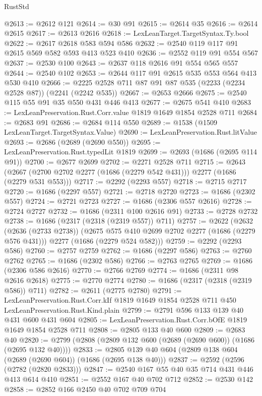 \begin{lexlean}{RustStd}
\begin{coremodule}
@2613 := @2612 @121
@2614 := @30 @91
@2615 := @2614 @35
@2616 := @2614 @2615
@2617 := @2613 @2616
@2618 := LexLeanTarget.TargetSyntax.Ty.bool
@2622 := @2617 @2618 @583 @594 @586
@2632 := @2540 @119 @117 @91 @2615 @569 @582 @593 @413 @523 @410
@2636 := @2552 @119 @91 @554 @567
@2637 := @2530 @100
@2643 := @2637 @118 @2616 @91 @554 @565 @557
@2644 := @2540 @102
@2653 := @2644 @117 @91 @2615 @535 @553 @564 @413 @530 @410
@2666 := @2225 @2528 @711 @87 @91 @87 @535 (@2233 (@2234 @2528 @87)) (@2241 (@2242 @535))
@2667 := @2653 @2666
@2675 := @2540 @115 @55 @91 @35 @550 @431 @446 @413
@2677 := @2675 @541 @410
@2683 := LexLeanPreservation.Rust.Corr.value @1819 @1649 @1854 @2528 @711
@2684 := @2683 @91
@2686 := @2684 @114 @550
@2689 := @1538 (@1509 LexLeanTarget.TargetSyntax.Value)
@2690 := LexLeanPreservation.Rust.litValue
@2693 := @2686 (@2689 (@2690 @550))
@2695 := LexLeanPreservation.Rust.typedLit @1819
@2699 := @2693 (@1686 (@2695 @114 @91))
@2700 := @2677 @2699
@2702 := @2271 @2528 @711
@2715 := @2643 (@2667 (@2700 @2702 @2277 (@1686 (@2279 @542 @431))) @2277 (@1686 (@2279 @531 @553)))
@2717 := @2292 (@2293 @557)
@2718 := @2715 @2717
@2720 := @1686 (@2297 @557)
@2721 := @2718 @2720
@2723 := @1686 (@2302 @557)
@2724 := @2721 @2723
@2727 := @1686 (@2306 @557 @2616)
@2728 := @2724 @2727
@2732 := @1686 (@2311 @100 @2616 @91)
@2733 := @2728 @2732
@2738 := @1686 (@2317 (@2318 (@2319 @557)) @711)
@2757 := @2622
    (@2632
      (@2636 (@2733 @2738))
      (@2675 @575 @410 @2699 @2702 @2277 (@1686 (@2279 @576 @431)))
      @2277
      (@1686 (@2279 @524 @582)))
@2759 := @2292 (@2293 @586)
@2760 := @2757 @2759
@2762 := @1686 (@2297 @586)
@2763 := @2760 @2762
@2765 := @1686 (@2302 @586)
@2766 := @2763 @2765
@2769 := @1686 (@2306 @586 @2616)
@2770 := @2766 @2769
@2774 := @1686 (@2311 @98 @2616 @2618)
@2775 := @2770 @2774
@2780 := @1686 (@2317 (@2318 (@2319 @586)) @711)
@2782 := @2611 (@2775 @2780)
@2791 := LexLeanPreservation.Rust.Corr.kIf
    @1819
    @1649
    @1854
    @2528
    @711
    @450
    LexLeanPreservation.Rust.Kind.plain
@2799 := @2791 @596 @133 @139 @40 @431 @600 @431 @604
@2805 := LexLeanPreservation.Rust.Corr.bOfE @1819 @1649 @1854 @2528 @711
@2808 := @2805 @133 @40 @600
@2809 := @2683 @40
@2820 := @2799 (@2808 (@2809 @132 @600 (@2689 (@2690 @600)) (@1686 (@2695 @132 @40))))
@2833 := @2805 @139 @40 @604 (@2809 @138 @604 (@2689 (@2690 @604)) (@1686 (@2695 @138 @40)))
@2837 := @2592 (@2596 (@2782 (@2820 @2833)))
@2847 := @2540 @167 @55 @40 @35 @714 @431 @446 @413 @614 @410
@2851 := @2552 @167 @40 @702 @712
@2852 := @2530 @142
@2858 := @2852 @166 @2450 @40 @702 @709 @704

\end{coremodule}
\end{lexlean}

